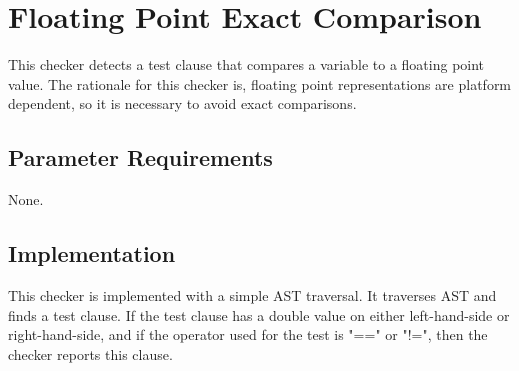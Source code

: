 %
%

\section{Floating Point Exact Comparison}
\label{FloatingPointExactComparison::overview}

This checker detects a test clause that compares a variable to a floating point value. The rationale for this checker is, floating point representations are platform dependent, so it is necessary to avoid exact comparisons.


\subsection{Parameter Requirements}

None.

\subsection{Implementation}

This checker is implemented with a simple AST traversal. It traverses AST and finds a test clause. If the test clause has a double value on either left-hand-side or right-hand-side, and if the operator used for the test is "==" or "!=", then the checker reports this clause.


